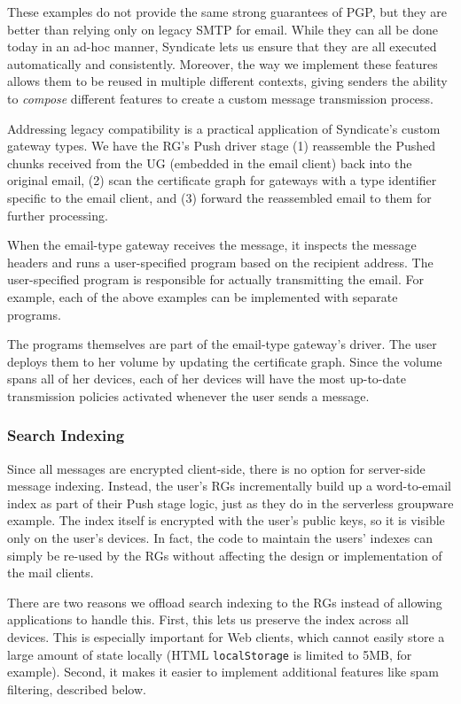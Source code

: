 These examples do not provide the same strong guarantees of PGP, but they are
better than relying only on legacy SMTP for email.  While they can all be done
today in an ad-hoc manner, Syndicate lets us ensure that they are all executed
automatically and consistently.  Moreover, the way we implement these features
allows them to be reused in multiple different contexts, giving senders the
ability to \emph{compose} different features to create a custom message
transmission process.

Addressing legacy compatibility is a practical application of Syndicate's custom
gateway types.  We have the RG's
Push driver stage (1) reassemble the Pushed chunks received from the UG
(embedded in the email client) back into the original email, (2)
scan the certificate graph for gateways with a type identifier specific to the
email client, and (3) forward the reassembled email to them for further
processing.

When the email-type gateway receives the message, it inspects the message
headers and runs a user-specified program based on the recipient address.  The
user-specified program is responsible for actually transmitting the email.
For example, each of the above examples can be implemented with separate
programs.

The programs themselves are part of the email-type gateway's driver.  The user
deploys them to her volume by updating the certificate graph.  Since the volume
spans all of her devices, each of her devices will have the most up-to-date
transmission policies activated whenever the user sends a message.

\subsubsection{Search Indexing}

Since all messages are encrypted client-side, there is no option for server-side
message indexing.  Instead, the user's RGs incrementally build up a
word-to-email index as part of their Push stage logic, just as they do in the
serverless groupware example.  The index itself is
encrypted with the user's public keys, so it is visible only on the user's devices. 
In fact, the code to maintain the users' indexes can simply be re-used by the
RGs without affecting the design or implementation of the mail clients.

There are two reasons we offload search indexing to the RGs instead of allowing
applications to handle this.  First, this lets us preserve the index across all devices. 
This is especially important for Web clients, which cannot easily store a large amount of state
locally (HTML \texttt{localStorage} is limited to 5MB, for example).  Second, it
makes it easier to implement additional features like spam filtering, described below.

